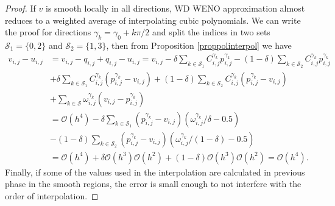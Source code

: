 \begin{proof}
If $v$ is smooth locally in all directions, {WD} WENO approximation almost reduces to  a weighted average of interpolating cubic polynomials. We can write the proof for directions $\gamma_k=\gamma_0+k\pi/2$ and split the indices in two sets   $\mathcal{S}_1=\{0,2\}$ and  $\mathcal{S}_2=\{1,3\}$, then from Proposition \ref{proppolinterpol} we have
$$
\begin{aligned}
	v_{i,j}-u_{i,j} & =	v_{i,j}-q_{i,j}+q_{i,j}-u_{i,j}=v_{i,j}-\delta\sum_{k\in \mathcal{S}_1} C_{i,j}^{\gamma_k}p^{\gamma_k}_{i,j}-(1-\delta)\sum_{k\in \mathcal{S}_2} C_{i,j}^{\gamma_k}p^{\gamma_k}_{i,j} \\
	&+\delta\sum_{k\in \mathcal{S}_1} C^{\gamma_k}_{i,j}\left(p_{i,j}^{\gamma_k}-v_{i,j}\right)+(1-\delta)\sum_{k\in \mathcal{S}_2} C^{\gamma_k}_{i,j}\left(p_{i,j}^{\gamma_k}-v_{i,j}\right) \\
	&+\sum_{k\in \mathcal{S}} \omega^{\gamma_k}_{i,j}\left(v_{i,j}-p_{i,j}^{\gamma_k}\right)\\
	& =	\mathcal{O}\left(h^4\right)- \delta\sum_{k\in \mathcal{S}_1} \left(p^{\gamma_k}_{i,j}-v_{i,j}\right)\left(\omega_{i,j}^{\gamma_k}/\delta-0.5\right)\\
	&-(1-\delta)\sum_{k\in \mathcal{S}_2} \left(p^{\gamma_k}_{i,j}-v_{i,j}\right)\left(\omega_{i,j}^{\gamma_k}/(1-\delta)-0.5\right)\\
	& = \mathcal{O}\left(h^4\right)+\delta \mathcal{O}(h^3) \mathcal{O}\left(h^2\right)+(1-\delta) \mathcal{O}(h^3) \mathcal{O}\left(h^2\right)=\mathcal{O}\left(h^4\right) .
\end{aligned}
$$
Finally, if some of the values used in the interpolation are calculated in previous phase in the smooth regions, the error is small enough to not interfere with the order of interpolation.
\vspace{-1em}
\end{proof}	

